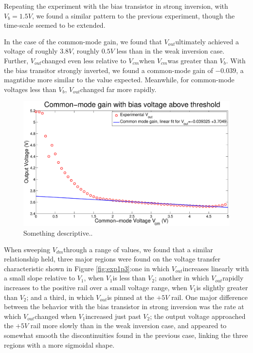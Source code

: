 \documentclass{article}
\newcommand{\Vout}{{$V_{out}$}}
\newcommand{\Vb}{{$V_{b}$}}
\newcommand{\Vcm}{{$V_{cm}$}}
\newcommand{\Vdm}{{$V_{dm}$}}
\newcommand{\Vtwo}{{$V_{2}$}}
\newcommand{\Vone}{{$V_{1}$}}
\begin{document}
Repeating the experiment with the bias transistor in strong inversion, with $V_b = 1.5V$, we found a similar pattern to the previous experiment, though the time-scale seemed to be extended.

In the case of the common-mode gain, we found that \Vout ultimately achieved a voltage of roughly $3.8V$, roughly $0.5V$ less than in the weak inversion case. Further, \Vout changed even less relative to \Vcm when \Vcm was greater than \Vb. With the bias transitor strongly inverted, we found a common-mode gain of $-0.039$, a magntidue more similar to the value expected. Meanwhile, for common-mode voltages less than \Vb, \Vout changed far more rapidly.

\begin{figure}[H]
\centering
\includegraphics[width=\linewidth]{../Figures/Exp1P4.eps}
\caption{Something descriptive..}
\label{fig:exp1p4}
\end{figure}

When sweeping \Vdm through a range of values, we found that a similar relationship held, three major regions were found on the voltage transfer characteristic shown in Figure \ref{fig:exp1p3}:one in which \Vout increases linearly with a small slope relative to \Vone, when \Vone is less than \Vtwo; another in which \Vout rapidly increases to the positive rail over a small voltage range, when \Vone is slightly greater than \Vtwo; and a third, in which \Vout is pinned at the $+5V$ rail.
One major difference between the behavior with the bias transistor in strong inversion was the rate at which \Vout changed when \Vone increased just past \Vtwo; the output voltage approached the $+5V$ rail more slowly than in the weak inversion case, and appeared to somewhat smooth the discontinuities found in the previous case, linking the three regions with a more sigmoidal shape.
\end{document}
